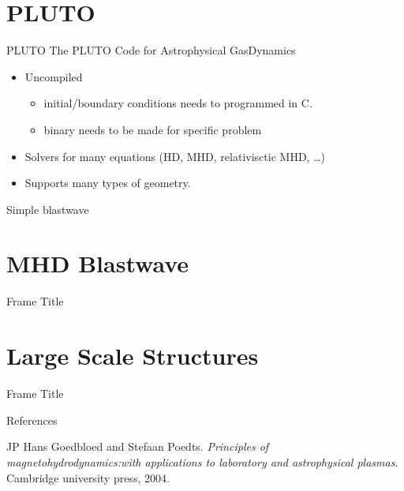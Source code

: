 \documentclass{beamer}
\begin{document}
\section{PLUTO}
\begin{frame}{PLUTO}	
	The PLUTO Code for Astrophysical GasDynamics
	\begin{itemize}
		\item Uncompiled
			\begin{itemize}
				\item initial/boundary conditions needs to programmed in C.
				\item binary needs to be made for specific problem
			\end{itemize} 		\item Solvers for many equations (HD, MHD, relativisctic MHD, \ldots)
		\item Supports many types of geometry. 
	\end{itemize}
\end{frame}
\begin{frame}{Simple blastwave}

\end{frame}
\section{MHD Blastwave}
\begin{frame}{Frame Title}
    
\end{frame}
\section{Large Scale Structures}
\begin{frame}{Frame Title}
    
\end{frame}

\begin{frame}{References}
    \begin{itemize}\footnotesize{
        \item JP Hans Goedbloed and Stefaan Poedts. \textit{Principles of magnetohydrodynamics:with applications to laboratory and astrophysical plasmas.} Cambridge university press, 2004.
    }
    \end{itemize}
\end{frame}
\end{document}

